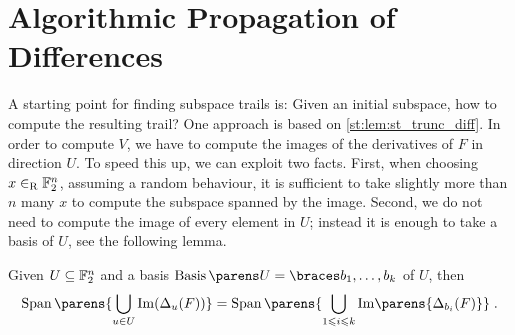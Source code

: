 \section{Algorithmic Propagation of Differences}\label{sec:st:compute_trail}

A starting point for finding subspace trails is: Given an initial subspace, how to compute the resulting trail?
One approach is based on \cref{st:lem:st_trunc_diff}.
In order to compute $V$, we have to compute the images of the derivatives of $F$ in direction $U$.
To speed this up, we can exploit two facts.
First, when choosing $x \in_\mathrm{R} \mathbb{F}_2^n$, assuming a random behaviour, it is sufficient to take slightly more than $n$ many $x$ to compute the subspace spanned by the image.
Second, we do not need to compute the image of every element in $U$; instead it is enough to take a basis of $U$, see the following lemma.
\begin{lemma}\label{st:lem:2}
Given $U \subseteq \mathbb{F}_2^n$ and a basis $\Basis{U} = \set{b_1, \ldots, b_k}$ of $U$, then
\begin{equation*}
    \SpanOp\parens{\bigcup_{u \in U} \mathrm{Im}(\Delta_u(F))} = \SpanOp\parens{\bigcup_{1 \leqslant i \leqslant k} \mathrm{Im}\parens{\Delta_{b_i}(F)}}\;.
\end{equation*}
\end{lemma}
